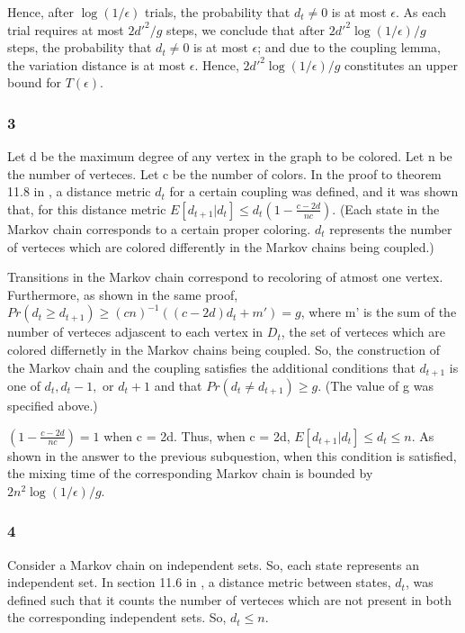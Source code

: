 \documentclass[10pt]{amsart}
\theoremstyle{remark}
\begin{document}
Hence, after $\log (1/\epsilon)$ trials, the probability that $d_{t} \neq 0$ is at most $\epsilon$. As each trial requires at most $2d'^{2}/g$ steps, we conclude that after $2d'^{2}\log (1/\epsilon)/g$ steps, the probability that $d_{t} \neq 0$ is at most $\epsilon$; and due to the coupling lemma, the variation distance is at most $\epsilon$. Hence, $2d'^{2}\log (1/\epsilon)/g$ constitutes an upper 
bound for $T(\epsilon)$.

\subsubsection{3}
Let d be the maximum degree of any vertex in the graph to be colored. Let n be the number of verteces. Let c be the number of colors. In the proof to theorem 11.8 in \cite{mitzenmacherUpfal}, a distance metric $d_{t}$ for a certain coupling was defined, and it was shown that, for this distance metric $E[d_{t+1}|d_{t}]\leq d_{t} (1-\frac{c-2d}{nc})$. (Each state in the Markov chain corresponds to a certain proper coloring. $d_{t}$ represents the number of verteces which are colored differently in the Markov chains being coupled.)

Transitions in the Markov chain correspond to recoloring of atmost one vertex. Furthermore, as shown in the same proof, $Pr(d_{t} \geq d_{t+1})\geq (cn)^{-1}((c-2d)d_{t}+m') = g$, where m' is the sum of the number of verteces adjascent to each vertex in $D_{t}$, the set of verteces which are colored differnetly in the Markov chains being coupled. So, the construction of the Markov chain and the coupling satisfies the additional conditions that $d_{t+1}$ is one of $d_{t}, d_{t}-1,$ or $d_{t}+1$ and that $Pr(d_{t} \neq d_{t+1})\geq g$. (The value of g was specified above.)

$(1-\frac{c-2d}{nc}) = 1$ when c = 2d. Thus, when c = 2d, $E[d_{t+1}|d_{t}]\leq d_{t} \leq n$. As shown in the answer to the previous subquestion, when this condition is satisfied, the mixing time of the corresponding Markov chain is bounded by $2n^{2}\log (1/\epsilon)/g$.

\subsubsection{4}
Consider a Markov chain on independent sets. So, each state represents an independent set. In section 11.6 in \cite{mitzenmacherUpfal}, a distance metric between states, $d_{t}$, was defined such that it counts the number of verteces which are not present in both the corresponding independent sets. So, $d_{t} \leq n$.
\end{document}
